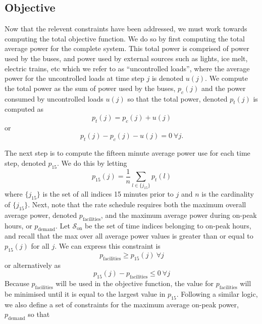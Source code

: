 \subsection{Objective\label{sec:objective}}
\par Now that the relevent constraints have been addressed, we must work towards computing the total objective function. We do so by first computing the total average power for the complete system. This total power is comprised of power used by the buses, and power used by external sources such as lights, ice melt, electric trains, etc which we refer to as ``uncontrolled loads'', where the average power for the uncontrolled loads at time step $j$ is denoted $u(j)$. We compute the total power as the sum of power used by the buses, $p_c(j)$ and the power consumed by uncontrolled loads $u(j)$ so that the total power, denoted $p_t(j)$ is computed as 
\begin{equation*}
	p_t(j) = p_c(j) + u(j)
\end{equation*}
or 
\begin{equation}
	p_t(j) - p_c(j) - u(j) = 0 \ \forall j.
\end{equation}
\par The next step is to compute the fifteen minute average power use for each time step, denoted $p_{\text{15}}$. We do this by letting 
\begin{equation*}
p_{\text{15}}(j) = \frac{1}{n}\sum_{l \in \{j_{15}\}}p_t(l)
\end{equation*}
where $\{j_{15}\}$ is the set of all indices 15 minutes prior to $j$ and $n$ is the cardinality of $\{j_{15}\}$.
Next, note that the rate schedule requires both the maximum overall average power, denoted $p_{\text{facilities}}$, and the maximum average power during on-peak hours, or $p_{\text{demand}}$. Let $\mathcal{S}_{\text{on}}$ be the set of time indices belonging to on-peak hours, and recall that the max over all average power values is greater than or equal to $p_{15}(j)$ for all $j$. We can express this constraint is
\begin{equation*}
	p_{\text{facilities}} \ge p_{15}(j) \ \forall j
\end{equation*}
or alternatively as
\begin{equation}
	p_{15}(j) - p_{\text{facilities}} \le 0 \ \forall j
\end{equation}
Because $p_{\text{facilities}}$ will be used in the objective function, the value for $p_{\text{facilities}}$ will be minimised until it is equal to the largest value in $p_{15}$. Following a similar logic, we also define a set of constraints for the maximum average on-peak power, $p_{\text{demand}}$ so that
